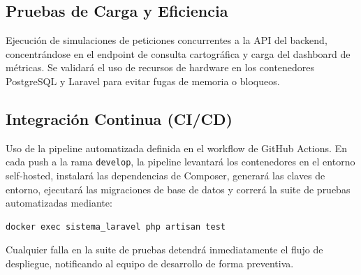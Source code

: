 \subsection{Pruebas de Carga y Eficiencia}
Ejecución de simulaciones de peticiones concurrentes a la API del backend, concentrándose en el endpoint de consulta cartográfica y carga del dashboard de métricas. Se validará el uso de recursos de hardware en los contenedores PostgreSQL y Laravel para evitar fugas de memoria o bloqueos.

\subsection{Integración Continua (CI/CD)}
Uso de la pipeline automatizada definida en el workflow de GitHub Actions. En cada push a la rama \texttt{develop}, la pipeline levantará los contenedores en el entorno self-hosted, instalará las dependencias de Composer, generará las claves de entorno, ejecutará las migraciones de base de datos y correrá la suite de pruebas automatizadas mediante:

\begin{verbatim}
docker exec sistema_laravel php artisan test
\end{verbatim}

Cualquier falla en la suite de pruebas detendrá inmediatamente el flujo de despliegue, notificando al equipo de desarrollo de forma preventiva.